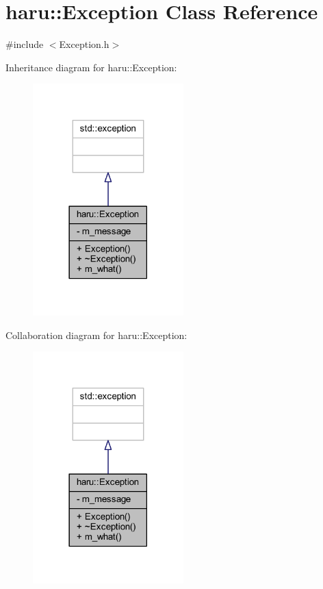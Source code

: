 \hypertarget{classharu_1_1_exception}{}\section{haru\+:\+:Exception Class Reference}
\label{classharu_1_1_exception}


{\ttfamily \#include $<$Exception.\+h$>$}



Inheritance diagram for haru\+:\+:Exception\+:\nopagebreak
\begin{figure}[H]
\begin{center}
\leavevmode
\includegraphics[width=165pt]{classharu_1_1_exception__inherit__graph}
\end{center}
\end{figure}


Collaboration diagram for haru\+:\+:Exception\+:\nopagebreak
\begin{figure}[H]
\begin{center}
\leavevmode
\includegraphics[width=165pt]{classharu_1_1_exception__coll__graph}
\end{center}
\end{figure}
